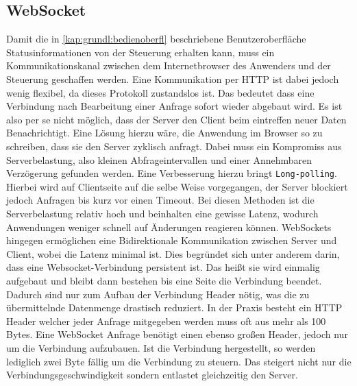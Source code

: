 \subsection{WebSocket} \label{chp:grdlgn:webSocket}
Damit die in \ref{kap:grundl:bedienoberfl} beschriebene Benutzeroberfläche Statusinformationen von der Steuerung erhalten kann, muss ein Kommunikationskanal zwischen dem Internetbrowser des Anwenders und der Steuerung geschaffen werden. Eine Kommunikation per HTTP ist dabei jedoch wenig flexibel, da dieses Protokoll zustandslos ist. Das bedeutet dass eine Verbindung nach Bearbeitung einer Anfrage sofort wieder abgebaut wird. Es ist also per se nicht möglich, dass der Server den Client beim eintreffen neuer Daten Benachrichtigt. Eine Lösung hierzu wäre, die Anwendung im Browser so zu schreiben, dass sie den Server zyklisch anfragt. Dabei muss ein Kompromiss aus Serverbelastung, also kleinen Abfrageintervallen und einer Annehmbaren Verzögerung gefunden werden. Eine Verbesserung hierzu bringt \texttt{Long-polling}. Hierbei wird auf Clientseite auf die selbe Weise vorgegangen, der Server blockiert jedoch Anfragen bis kurz vor einen Timeout. Bei diesen Methoden ist die Serverbelastung relativ hoch und beinhalten eine gewisse Latenz, wodurch Anwendungen weniger schnell auf Änderungen reagieren können. WebSockets hingegen ermöglichen eine Bidirektionale Kommunikation zwischen Server und Client, wobei die Latenz minimal ist. Dies begründet sich unter anderem darin, dass eine Websocket-Verbindung persistent ist. Das heißt sie wird einmalig aufgebaut und bleibt dann bestehen bis eine Seite die Verbindung beendet. Dadurch sind nur zum Aufbau der Verbindung Header nötig, was die zu übermittelnde Datenmenge drastisch reduziert. In der Praxis besteht ein HTTP Header welcher jeder Anfrage mitgegeben werden muss oft aus mehr als 100 Bytes. Eine WebSocket Anfrage benötigt einen ebenso großen Header, jedoch nur um die Verbindung aufzubauen. Ist die Verbindung hergestellt, so werden lediglich zwei Byte fällig um die Verbindung zu steuern. Das steigert nicht nur die Verbindungsgeschwindigkeit sondern entlastet gleichzeitig den Server.
\clearpage
